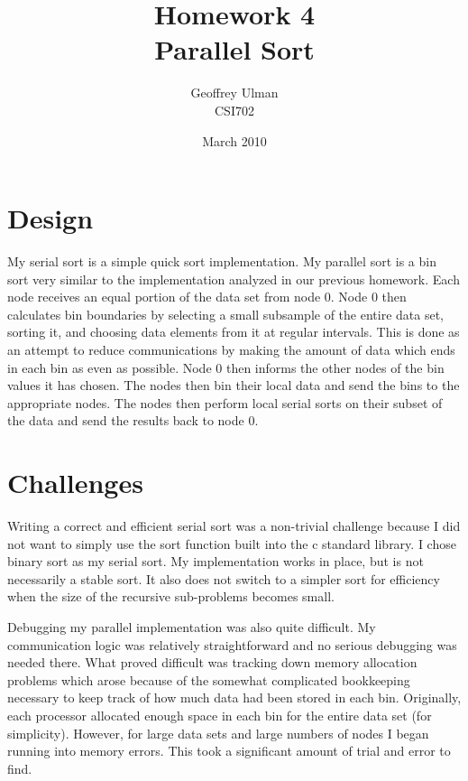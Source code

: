 \documentclass{article}
\begin{document}
\title{Homework 4\\
       Parallel Sort}
\author{Geoffrey Ulman\\
        CSI702}
\date{March 2010}
\maketitle

\section{Design}
My serial sort is a simple quick sort implementation. My parallel sort is a bin sort very similar to the implementation analyzed in our previous homework. Each node receives an equal portion of the data set from node 0. Node 0 then calculates bin boundaries by selecting a small subsample of the entire data set, sorting it, and choosing data elements from it at regular intervals. This is done as an attempt to reduce communications by making the amount of data which ends in each bin as even as possible. Node 0 then informs the other nodes of the bin values it has chosen. The nodes then bin their local data and send the bins to the appropriate nodes. The nodes then perform local serial sorts on their subset of the data and send the results back to node 0.

\section{Challenges}
Writing a correct and efficient serial sort was a non-trivial challenge because I did not want to simply use the sort function built into the c standard library. I chose binary sort as my serial sort. My implementation works in place, but is not necessarily a stable sort. It also does not switch to a simpler sort for efficiency when the size of the recursive sub-problems becomes small.

Debugging my parallel implementation was also quite difficult. My communication logic was relatively straightforward and no serious debugging was needed there. What proved difficult was tracking down memory allocation problems which arose because of the somewhat complicated bookkeeping necessary to keep track of how much data had been stored in each bin. Originally, each processor allocated enough space in each bin for the entire data set (for simplicity). However, for large data sets and large numbers of nodes I began running into memory errors. This took a significant amount of trial and error to find.
\end{document}
